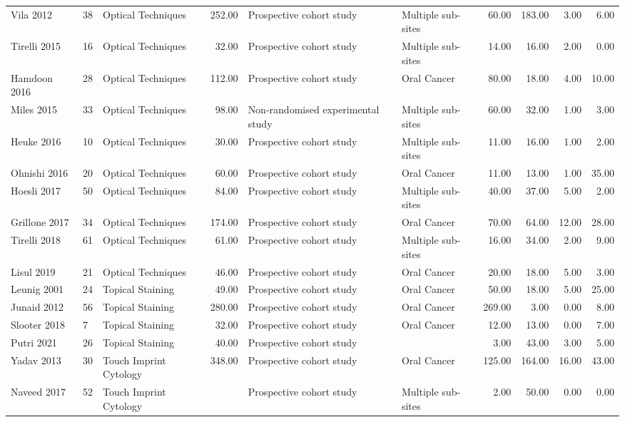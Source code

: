 \begin{table}[ht]
\begin{tabular}{lllrllrrrr}
  Vila 2012 & 38 & Optical Techniques & 252.00 & Prospective cohort study & Multiple sub-sites & 60.00 & 183.00 & 3.00 & 6.00 \\ 
  Tirelli 2015 & 16 & Optical Techniques & 32.00 & Prospective cohort study & Multiple sub-sites & 14.00 & 16.00 & 2.00 & 0.00 \\ 
  Hamdoon 2016 & 28 & Optical Techniques & 112.00 & Prospective cohort study & Oral Cancer & 80.00 & 18.00 & 4.00 & 10.00 \\ 
  Miles 2015 & 33 & Optical Techniques & 98.00 & Non-randomised experimental study & Multiple sub-sites & 60.00 & 32.00 & 1.00 & 3.00 \\ 
  Heuke 2016 & 10 & Optical Techniques & 30.00 & Prospective cohort study & Multiple sub-sites & 11.00 & 16.00 & 1.00 & 2.00 \\ 
  Ohnishi 2016 & 20 & Optical Techniques & 60.00 & Prospective cohort study & Oral Cancer & 11.00 & 13.00 & 1.00 & 35.00 \\ 
  Hoesli 2017 & 50 & Optical Techniques & 84.00 & Prospective cohort study & Multiple sub-sites & 40.00 & 37.00 & 5.00 & 2.00 \\ 
  Grillone 2017 & 34 & Optical Techniques & 174.00 & Prospective cohort study & Oral Cancer & 70.00 & 64.00 & 12.00 & 28.00 \\ 
  Tirelli 2018 & 61 & Optical Techniques & 61.00 & Prospective cohort study & Multiple sub-sites & 16.00 & 34.00 & 2.00 & 9.00 \\ 
  Lisul 2019 & 21 & Optical Techniques & 46.00 & Prospective cohort study & Oral Cancer & 20.00 & 18.00 & 5.00 & 3.00 \\ 
  Leunig 2001 & 24 & Topical Staining & 49.00 & Prospective cohort study & Oral Cancer & 50.00 & 18.00 & 5.00 & 25.00 \\ 
  Junaid 2012 & 56 & Topical Staining & 280.00 & Prospective cohort study & Oral Cancer & 269.00 & 3.00 & 0.00 & 8.00 \\ 
  Slooter 2018 & 7 & Topical Staining & 32.00 & Prospective cohort study & Oral Cancer & 12.00 & 13.00 & 0.00 & 7.00 \\ 
  Putri 2021 & 26 & Topical Staining & 40.00 & Prospective cohort study &  & 3.00 & 43.00 & 3.00 & 5.00 \\ 
  Yadav 2013 & 30 & Touch Imprint Cytology & 348.00 & Prospective cohort study & Oral Cancer & 125.00 & 164.00 & 16.00 & 43.00 \\ 
  Naveed 2017 & 52 & Touch Imprint Cytology &  & Prospective cohort study & Multiple sub-sites & 2.00 & 50.00 & 0.00 & 0.00 \\ 

\end{tabular}
\end{table}
